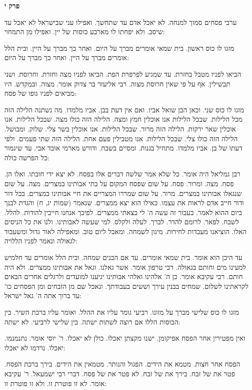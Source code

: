 \documentclass[12pt, openany]{book}
\newcommand{\sethebfont}{
\fontsize{10.5pt}{21.0pt} \selectfont
}
\newcommand{\textblock}[1]{
{\sethebfont #1\\}	
}
\newcommand{\sectname}{}
\newcommand{\newsection}[1]{
	\addcontentsline{toc}{section}{#1}
	\renewcommand{\sectname}{#1}	
	\vspace{-\baselineskip}
	\begin{center}
		\textbf{%
\fontsize{16pt}{16pt}\selectfont
			#1}
	\end{center}
	\vspace{-\baselineskip}
	\nopagebreak
}
\begin{document}
\newsection{פרק י}
\textblock{ערבי פסחים סמוך למנחה. לא יאכל אדם עד שתחשך. ואפילו עני שבישראל לא יאכל עד שיסב. ולא יפחתו לו מארבע כוסות של יין. ואפילו מן התמחוי:  }
\textblock{מזגו לו כוס ראשון. בית שמאי אומרים מברך על היום. ואחר כך מברך על היין. ובית הלל אומרים מברך על היין. ואחר כך מברך על היום:  }
\textblock{הביאו לפניו מטבל בחזרת. עד שמגיע לפרפרת הפת. הביאו לפניו מצה וחזרת. וחרוסת. ושני תבשילין. אף על פי שאין חרוסת מצוה. רבי אליעזר בר צדוק אומר. מצוה. ובמקדש. היו מביאים לפניו גופו של פסח:  }
\textblock{מזגו לו כוס שני. וכאן הבן שואל אביו. ואם אין דעת בבן. אביו מלמדו. מה נשתנה הלילה הזה מכל הלילות. שבכל הלילות אנו אוכלין חמץ ומצה. הלילה הזה כולו מצה. שבכל הלילות. אנו אוכלין שאר ירקות. הלילה הזה מרור. שבכל הלילות. אנו אוכלין בשר צלי. שלוק. ומבושל. הלילה הזה כולו צלי. שבכל הלילות. אנו מטבילין פעם אחת. הלילה הזה שתי פעמים. ולפי דעתו של בן. אביו מלמדו. מתחיל בגנות. ומסיים בשבח. ודורש מארמי אובד אבי. עד שיגמור כל הפרשה כולה:  }
\textblock{רבן גמליאל היה אומר. כל שלא אמר שלשה דברים אלו בפסח. לא יצא ידי חובתו. ואלו הן. פסח. מצה. ומרור. פסח. על שום שפסח המקום על בתי אבותינו במצרים. מצה. על שום שנגאלו אבותינו במצרים. מרור. על שום שמררו המצריים את חיי אבותינו במצרים. בכל דור ודור חייב אדם לראות את עצמו. כאילו הוא יצא ממצרים. שנאמר (שמות יג, ח) והגדת לבנך ביום ההוא לאמר. בעבור זה עשה ה' לי בצאתי ממצרים. לפיכך אנחנו חייבין להודות. להלל. לשבח. לפאר. לרומם להדר. לברך. לעלה ולקלס. למי שעשה לאבותינו. ולנו את כל הניסים האלו. הוציאנו מעבדות לחירות. מיגון לשמחה. ומאבל ליום טוב. ומאפילה לאור גדול ומשעבוד לגאולה ונאמר לפניו הללויה:  }
\textblock{עד היכן הוא אומר. בית שמאי אומרים. עד אם הבנים שמחה. ובית הלל אומרים עד חלמיש למעינו מים וחותם בגאולה. רבי טרפון אומר. אשר גאלנו. וגאל את אבותינו ממצרים. ולא היה חותם. רבי עקיבא אומר. כן ה' אלהינו ואלהי אבותינו יגיענו למועדים ולרגלים אחרים הבאים לקראתינו לשלום. שמחים בבנין עירך וששים בעבודתך. ונאכל שם מן הזבחים ומן הפסחים כו' עד ברוך אתה ה' גאל ישראל:  }
\textblock{מזגו לו כוס שלישי מברך על מזונו. רביעי גומר עליו את ההלל. ואומר עליו ברכת השיר. בין הכוסות הללו אם רוצה לשתות ישתה. בין שלישי לרביעי. לא ישתה:  }
\textblock{ואין מפטירין אחר הפסח אפיקומן. ישנו מקצתן יאכלו. כולן לא יאכלו. ר' יוסי אומר. נתנמנמו. יאכלו. נרדמו לא יאכלו:  }
\textblock{הפסח אחר חצות. מטמא את הידים. הפגול והנותר. מטמאין את הידים. בירך ברכת הפסח. פטר את של זבח. בירך את של זבח. לא פטר את של פסח. דברי רבי ישמעאל. ר' עקיבא אומר. לא זו פוטרת זו. ולא זו פוטרת זו:   }
\end{document}
